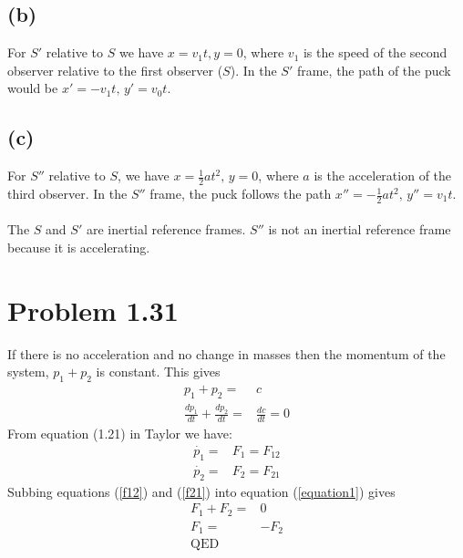 \documentclass[12pt, a4paper]{article}
\begin{document}
\subsection*{(b)}
For $S'$ relative to $S$ we have $x=v_1t, y=0$, where $v_1$ is the speed of the second observer relative to the first observer ($S$). In the $S'$ frame, the path of the puck would be $x'= -v_1t, \, y'=v_0t$. 
\subsection*{(c)}
For $S''$ relative to $S$, we have $x=\tfrac{1}{2}at^2, \, y=0$, where $a$ is the acceleration of the third observer. In the $S''$ frame, the puck follows the path $x''=-\tfrac{1}{2}at^2, \, y''=v_1t$.\\
\\
The $S$ and $S'$ are inertial reference frames. $S''$ is not an inertial reference frame because it is accelerating.





\section*{Problem 1.31}
If there is no acceleration and no change in masses then the momentum of the system, $p_1 + p_2$ is constant. This gives
\begin{align}
p_1 + p_2 =& c
\\
\frac{dp_1}{dt} + \frac{dp_2}{dt} =& \frac{dc}{dt} = 0 \label{equation1}
\end{align}
From equation (1.21) in Taylor we have:
\begin{align}
\dot{p_1} =& F_1 = F_{12} \label{f12}
\\
\dot{p_2} =& F_2 = F_{21} \label{f21}
\end{align}
Subbing equations (\ref{f12}) and (\ref{f21}) into equation (\ref{equation1}) gives
\begin{align*}
F_1 + F_2 =& 0
\\
F_1 =& - F_2
\\
\text{QED}
\end{align*}





\pagebreak
\end{document}
